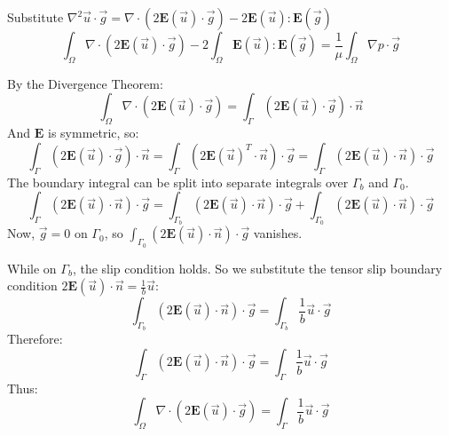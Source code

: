 \documentclass[12pt, a4paper, twoside, openright]{book}
\begin{document}

Substitute $ \nabla^2 \vec{u} \cdot \vec{g} = \nabla \cdot ( 2 \mathbf{E}(\vec{u}) \cdot \vec{g}) - 2 \mathbf{E}(\vec{u}):\mathbf{E}(\vec{g}) $
\begin{equation}
\int_{\Omega} \nabla \cdot ( 2 \mathbf{E}(\vec{u}) \cdot \vec{g} ) - 
2 \int_{\Omega} \mathbf{E}(\vec{u}) : \mathbf{E}(\vec{g})  = 
\frac{1}{\mu} \int_{\Omega}  \nabla p \cdot \vec{g}
\end{equation}

By the Divergence Theorem:
\begin{equation}
\int_{\Omega} \nabla \cdot ( 2 \mathbf{E}(\vec{u}) \cdot \vec{g} ) =
\int_{\Gamma} ( 2 \mathbf{E}(\vec{u}) \cdot \vec{g} ) \cdot \vec{n}
\end{equation}
And $\mathbf{E}$ is symmetric, so:
\begin{equation}
\int_{\Gamma} ( 2 \mathbf{E}(\vec{u}) \cdot \vec{g} ) \cdot \vec{n} =
\int_{\Gamma} ( 2 \mathbf{E}(\vec{u})^T \cdot \vec{n} ) \cdot \vec{g} =
\int_{\Gamma} ( 2 \mathbf{E}(\vec{u}) \cdot \vec{n} ) \cdot \vec{g}
\end{equation}
The boundary integral can be split into separate integrals over $\Gamma_b$ and $\Gamma_0$.\begin{equation}
\int_{\Gamma} ( 2 \mathbf{E}(\vec{u}) \cdot \vec{n} ) \cdot \vec{g} =
\int_{\Gamma_b} ( 2 \mathbf{E}(\vec{u}) \cdot \vec{n} ) \cdot \vec{g} +
\int_{\Gamma_0} ( 2 \mathbf{E}(\vec{u}) \cdot \vec{n} ) \cdot \vec{g}
\end{equation}
Now, $\vec{g} = 0$ on $\Gamma_0$, so $ \int_{\Gamma_0} ( 2 \mathbf{E}(\vec{u}) \cdot \vec{n} ) \cdot \vec{g} $ vanishes.

While on $\Gamma_b$, the slip condition holds.
So we substitute the tensor slip boundary condition $ 2 \mathbf{E}(\vec{u}) \cdot \vec{n} = \frac{1}{b} \vec{u}$:
\begin{equation}
\int_{\Gamma_b} ( 2 \mathbf{E}(\vec{u}) \cdot \vec{n} ) \cdot \vec{g} =
\int_{\Gamma_b} \frac{1}{b} \vec{u} \cdot \vec{g}
\end{equation}
Therefore:
\begin{equation}
\int_{\Gamma} ( 2 \mathbf{E}(\vec{u}) \cdot \vec{n} ) \cdot \vec{g} =
\int_{\Gamma} \frac{1}{b} \vec{u} \cdot \vec{g}
\end{equation}
Thus:
\begin{equation}
\int_{\Omega} \nabla \cdot ( 2 \mathbf{E}(\vec{u}) \cdot \vec{g} ) =
\int_{\Gamma} \frac{1}{b} \vec{u} \cdot \vec{g}
\end{equation}
\end{document}
